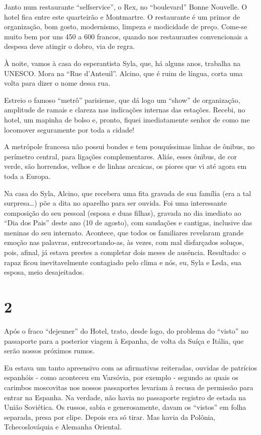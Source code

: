 Janto num restaurante “selfservice”, o Rex, no “boulevard” Bonne Nouvelle. O hotel fica entre este quarteirão e Montmartre. O restaurante é um primor de organização, bom gosto, modernismo, limpeza e modicidade de preço. Come-se muito bem por uns 450 a 600 francos, quando nos restaurantes convencionais a despesa deve atingir o dobro, via de regra.

À noite, vamos à casa do esperantista Syla, que, há alguns anos, trabalha na UNESCO. Mora na “Rue d’Anteuil”. Alcino, que é ruim de língua, corta uma volta para dizer o nome dessa rua.

Estreio o famoso “metrô” parisiense, que dá logo um “show” de organização, amplitude de ramais e clareza nas indicações internas das estações. Recebi, no hotel, um mapinha de bolso e, pronto, fiquei imediatamente senhor de como me locomover seguramente por toda a cidade!

A metrópole francesa não possui bondes e tem pouquíssimas linhas de ônibus, no perímetro central, para ligações complementares. Aliás, esses ônibus, de cor verde, são horrendos, velhos e de linhas arcaicas, os piores que vi até agora em toda a Europa.

Na casa do Syla, Alcino, que recebera uma fita gravada de sua família (era a tal surpresa\ldots) põe a dita no aparelho para ser ouvida. Foi uma interessante composição do seu pessoal (esposa e duas filhas), gravada no dia imediato ao “Dia dos Pais” deste ano (10 de agosto), com saudações e cantigas, inclusive das meninas do seu internato. Acontece, que todos os familiares revelaram grande emoção nas palavras, entrecortando-as, às vezes, com mal disfarçados soluços, pois, afinal, já estava prestes a completar dois meses de ausência. Resultado: o rapaz ficou inevitavelmente contagiado pelo clima e nós, eu, Syla e Leda, sua esposa, meio desajeitados.

\section*{2 \adfflatleafright {}}
Após o fraco “dejeuner” do Hotel, trato, desde logo, do problema do “visto” no passaporte para a posterior viagem à Espanha, de volta da Suíça e Itália, que serão nossos próximos rumos.

Eu estava um tanto apreensivo com as afirmativas reiteradas, ouvidas de patrícios espanhóis - como aconteceu em Varsóvia, por exemplo - segundo as quais os carimbos moscovitas nos nossos passaportes levariam à recusa de permissão para entrar na Espanha. Na verdade, não havia no passaporte registro de estada na União Soviética. Os russos, sabia e generosamente, davam os “vistos” em folha separada, presa por clipe. Depois era só tirar. Mas havia da Polônia, Tchecoslováquia e Alemanha Oriental.


